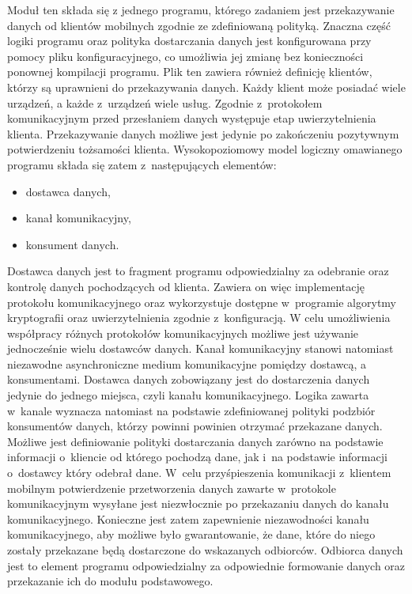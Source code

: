Moduł ten składa się z jednego programu, którego zadaniem jest
przekazywanie danych od klientów mobilnych zgodnie ze zdefiniowaną
polityką. Znaczna część logiki programu oraz polityka dostarczania
danych jest konfigurowana przy pomocy pliku konfiguracyjnego, co
umożliwia jej zmianę bez konieczności ponownej kompilacji
programu. Plik ten zawiera również definicję klientów, którzy są
uprawnieni do przekazywania danych. Każdy klient może posiadać wiele
urządzeń, a każde z~urządzeń wiele usług. Zgodnie z~protokołem
komunikacyjnym przed przesłaniem danych występuje etap
uwierzytelnienia klienta. Przekazywanie danych możliwe jest jedynie po
zakończeniu pozytywnym potwierdzeniu tożsamości
klienta. Wysokopoziomowy model logiczny omawianego programu składa się
zatem z~następujących elementów:

\begin{itemize}
\item dostawca danych,
\item kanał komunikacyjny,
\item konsument danych.
\end{itemize}

Dostawca danych jest to fragment programu odpowiedzialny za odebranie
oraz kontrolę danych pochodzących od klienta. Zawiera on więc
implementację protokołu komunikacyjnego oraz wykorzystuje dostępne
w~programie algorytmy kryptografii oraz uwierzytelnienia zgodnie
z~konfiguracją. W celu umożliwienia współpracy różnych protokołów
komunikacyjnych możliwe jest używanie jednocześnie wielu dostawców
danych. Kanał komunikacyjny stanowi natomiast niezawodne
asynchroniczne medium komunikacyjne pomiędzy dostawcą, a
konsumentami. Dostawca danych zobowiązany jest do dostarczenia danych
jedynie do jednego miejsca, czyli kanału komunikacyjnego. Logika
zawarta w~kanale wyznacza natomiast na podstawie zdefiniowanej
polityki podzbiór konsumentów danych, którzy powinni powinien otrzymać
przekazane danych. Możliwe jest definiowanie polityki dostarczania
danych zarówno na podstawie informacji o~kliencie od którego pochodzą
dane, jak i~na podstawie informacji o~dostawcy który odebrał
dane. W~celu przyśpieszenia komunikacji z~klientem mobilnym
potwierdzenie przetworzenia danych zawarte w~protokole komunikacyjnym
wysyłane jest niezwłocznie po przekazaniu danych do kanału
komunikacyjnego. Konieczne jest zatem zapewnienie niezawodności kanału
komunikacyjnego, aby możliwe było gwarantowanie, że dane, które do
niego zostały przekazane będą dostarczone do wskazanych
odbiorców. Odbiorca danych jest to element programu odpowiedzialny za
odpowiednie formowanie danych oraz przekazanie ich do modułu
podstawowego.

